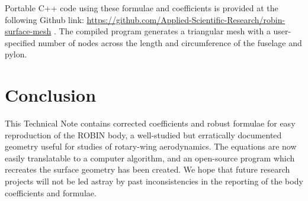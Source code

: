 \documentclass[journal]{new-aiaa}
\begin{document}
Portable C++ code using these formulae and coefficients is provided at the following Github link:
\url{https://github.com/Applied-Scientific-Research/robin-surface-mesh} \cite{robinsurfmesh}.
The compiled program generates a triangular mesh with a user-specified number of nodes across
the length and circumference of the fuselage and pylon.


\section{Conclusion}

This Technical Note contains corrected coefficients and robust formulae for
easy reproduction of the ROBIN body, a well-studied but erratically documented
geometry useful for studies of rotary-wing aerodynamics.
The equations are now easily translatable to a computer algorithm, and an
open-source program which recreates the surface geometry has been created.
We hope that future research projects will not be led astray by past 
inconsistencies in the reporting of the body coefficients and formulae.


%

\end{document}
